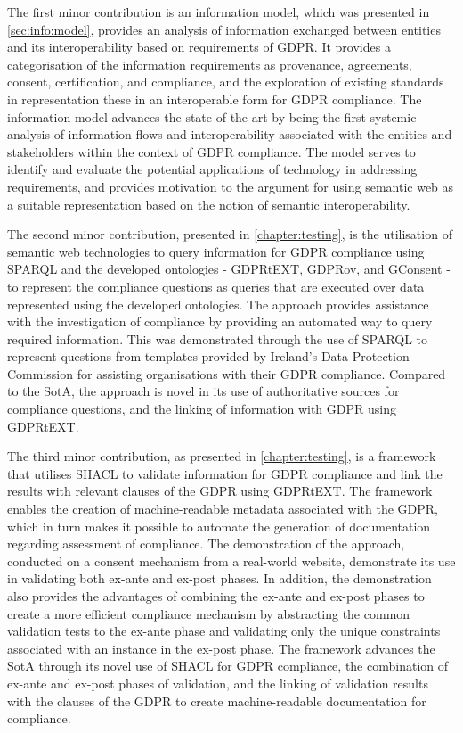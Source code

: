 The first minor contribution is an information model, which was presented in \autoref{sec:info:model}, provides an analysis of information exchanged between entities and its interoperability based on requirements of GDPR.
It provides a categorisation of the information requirements as provenance, agreements, consent, certification, and compliance, and the exploration of existing standards in representation these in an interoperable form for GDPR compliance.
The information model advances the state of the art by being the first systemic analysis of information flows and interoperability associated with the entities and stakeholders within the context of GDPR compliance.
The model serves to identify and evaluate the potential applications of technology in addressing requirements, and provides motivation to the argument for using semantic web as a suitable representation based on the notion of semantic interoperability.

The second minor contribution, presented in \autoref{chapter:testing}, is the utilisation of semantic web technologies to query information for GDPR compliance using SPARQL and the developed ontologies - GDPRtEXT, GDPRov, and GConsent - to represent the compliance questions as queries that are executed over data represented using the developed ontologies.
The approach provides assistance with the investigation of compliance by providing an automated way to query required information. This was demonstrated through the use of SPARQL to represent questions from templates provided by Ireland's Data Protection Commission for assisting organisations with their GDPR compliance.
Compared to the SotA, the approach is novel in its use of authoritative sources for  compliance questions, and the linking of information with GDPR using GDPRtEXT.

The third minor contribution, as presented in \autoref{chapter:testing}, is a framework that utilises SHACL to validate information for GDPR compliance and link the results with relevant clauses of the GDPR using GDPRtEXT. 
The framework enables the creation of machine-readable metadata associated with the GDPR, which in turn makes it possible to automate the generation of documentation regarding assessment of compliance.
The demonstration of the approach, conducted on a consent mechanism from a real-world website, demonstrate its use in validating both ex-ante and ex-post phases.
In addition, the demonstration also provides the advantages of combining the ex-ante and ex-post phases to create a more efficient compliance mechanism by abstracting the common validation tests to the ex-ante phase and validating only the unique constraints associated with an instance in the ex-post phase.
The framework advances the SotA through its novel use of SHACL for GDPR compliance, the combination of ex-ante and ex-post phases of validation, and the linking of validation results with the clauses of the GDPR to create machine-readable documentation for compliance.

